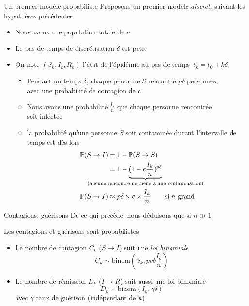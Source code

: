 \documentclass[10pt]{beamer}
\begin{document}
\begin{frame}{Un premier modèle probabiliste}
  Proposons un premier modèle \emph{discret}, suivant les hypothèses précédentes

  {\small
  \begin{itemize}
    \item Nous avons une population totale de $n$
    \item Le pas de temps de discrétisation $\delta$ est petit \\
    \item On note $(S_k, I_k, R_k)$ l'état de l'épidémie au pas de temps~$t_k = t_0 + k\delta$
      \begin{itemize}
        \item Pendant un temps $\delta$, chaque personne $S$ rencontre $p\delta$ personnes,\\
          avec une probabilité de contagion de $c$
        \item Nous avons une probabilité $\frac{I_k}{n}$ que chaque personne rencontrée \\ soit infectée
        \item la probabilité qu'une personne $S$ soit contaminée durant l'intervalle de temps est dès-lors
          \[
            \begin{aligned}
              \PP(S \to I) &= 1 - \PP(S \to S)  \\
                           &= 1 - \underbrace{(1 - c \frac{I_k}{n})^{p \delta}}_{\mathclap{\text{(aucune rencontre ne mène à une contamination)}}} \\
              \PP(S \to I)&\approx p \delta \times c \times \frac{I_k}{n} \qquad \text{si $n$ grand}
            \end{aligned}
          \]
      \end{itemize}
  \end{itemize}
  }

\end{frame}

\begin{frame}{Contagions, guérisons}
  De ce qui précède, nous déduisons que si $n \gg 1$
  \vspace{.5cm}
  \begin{block}{Les contagions et guérisons sont probabilistes}
    \begin{itemize}
      \item Le nombre de contagion $C_k$ ($S \to I$) suit une \emph{loi binomiale}
        \[
          C_k \sim \text{binom}(S_k, pc\delta \frac{I_k}{n})
        \]
        \vspace{-.5cm}
      \item Le nombre de rémission $D_k$ ($I \to R$)
        suit aussi une loi binomiale
        \[
          D_k \sim \text{binom}(I_k, \gamma \delta)
        \]
        avec $\gamma$ taux de guérison (indépendant de $n$)
    \end{itemize}
  \end{block}
\end{frame}
\end{document}
